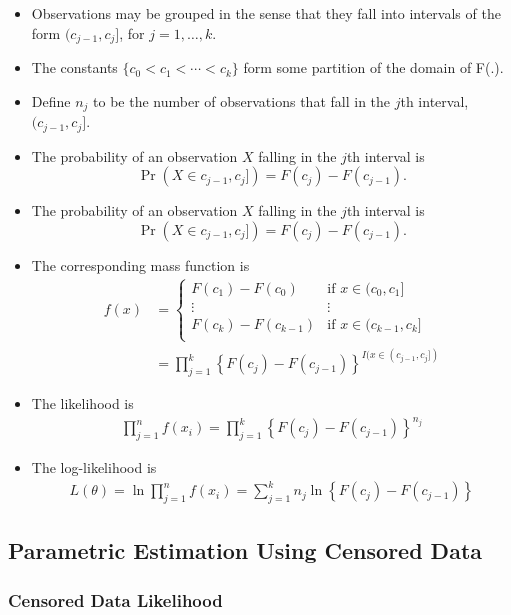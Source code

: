 \documentclass[]{book}
\begin{document}
\begin{itemize}
\item
  Observations may be grouped in the sense that they fall into intervals
  of the form \((c_{j-1}, c_j]\), for \(j=1, \ldots, k\).
\item
  The constants \(\{c_0 < c_1 < \cdots < c_k\}\) form some partition of
  the domain of F(.).
\item
  Define \(n_j\) to be the number of observations that fall in the
  \(j\)th interval, \((c_{j-1}, c_j]\).
\item
  The probability of an observation \(X\) falling in the \(j\)th
  interval is
  \[\Pr\left(X \in c_{j-1}, c_j]\right) = F(c_j) - F(c_{j-1}).\]
\item
  The probability of an observation \(X\) falling in the \(j\)th
  interval is
  \[\Pr\left(X \in c_{j-1}, c_j]\right) = F(c_j) - F(c_{j-1}).\]
\item
  The corresponding mass function is \[\begin{aligned}
  f(x) &=
  \begin{cases}
  F(c_1) - F(c_{0}) &   \textrm{if~} x \in (c_{0}, c_1]\\
  \vdots & \vdots \\
  F(c_k) - F(c_{k-1}) &   \textrm{if~} x \in (c_{k-1}, c_k]\\
  \end{cases} \\
  &= \prod_{j=1}^k \left\{F(c_j) - F(c_{j-1})\right\}^{I(x \in (c_{j-1}, c_j])}\end{aligned}\]
\item
  The likelihood is \[\begin{aligned}
  \prod_{j=1}^n f(x_i) = \prod_{j=1}^k \left\{F(c_j) - F(c_{j-1})\right\}^{n_j}\end{aligned}\]
\item
  The log-likelihood is \[\begin{aligned}
  L(\theta) = \ln \prod_{j=1}^n f(x_i) = \sum_{j=1}^k n_j \ln \left\{F(c_j) - F(c_{j-1})\right\}\end{aligned}\]
\end{itemize}

\subsection{Parametric Estimation Using Censored
Data}\label{parametric-estimation-using-censored-data}

\subsubsection{Censored Data Likelihood}\label{censored-data-likelihood}
\end{document}
